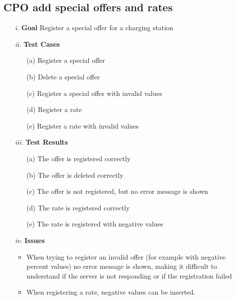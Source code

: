 \documentclass[table, 12pt]{article}
\begin{document}
\subsection{CPO add special offers and rates}
\begin{itemize}
    \item[\textit{i.}] \textbf{Goal} Register a special offer for a charging station
    \item[\textit{ii.}] \textbf{Test Cases}
    \begin{itemize}
        \item[(a)] Register a special offer
        \item[(b)] Delete a special offer
        \item[(c)] Register a special offer with invalid values
        \item[(d)] Register a rate
        \item[(e)] Register a rate with invalid values
    \end{itemize}
    \item[\textit{iii.}] \textbf{Test Results}
    \begin{itemize}
        \item[(a)] The offer is registered correctly
        \item[(b)] The offer is deleted correctly
        \item[(c)] The offer is not registered, but no error message is shown
        \item[(d)] The rate is registered correctly
        \item[(e)] The rate is registered with negative values
    \end{itemize} 
    \item[\textit{iv.}] \textbf{Issues}    
    \begin{itemize}
        \item When trying to register an invalid offer (for example with negative percent values) no error message is shown, making it difficult to understand if the server is not responding or if the registration failed
        \item When registering a rate, negative values can be inserted.
    \end{itemize} 
\end{itemize}
\end{document}
